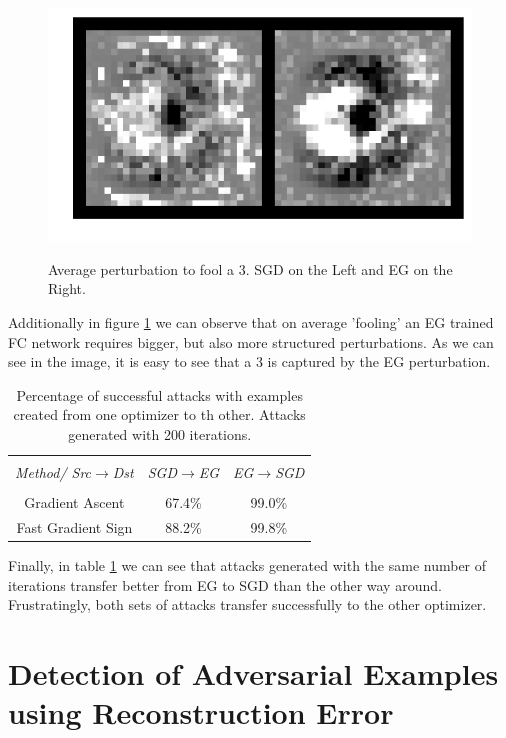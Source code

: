 \documentclass{asaproc}
\begin{document}
\begin{figure}
	\centering
	\caption{\enspace Average perturbation to fool a 3. SGD on the Left and EG on the Right.}
	\includegraphics[width=\linewidth]{avg_attack_3.png}
	\label{fig7}
\end{figure}

Additionally in figure \ref{fig7} we can observe that on average 'fooling' an EG trained FC network requires bigger, but also more structured perturbations. As we can see in the image, it is easy to see that a 3 is captured by the EG perturbation.

\begin{table}
	\caption{\enspace Percentage of successful attacks with examples created from one optimizer to th other. Attacks generated with 200 iterations.}
	\label{tab3}
	\begin{tabular*}{\hsize}{@{\extracolsep{\fill}}ccc}
		\hline
		\\[-7pt]
		\multicolumn{1}{c}{\it Method/ Src$\to$Dst} & 
		\multicolumn{1}{c}{\it SGD$\to$EG}          & 
		\multicolumn{1}{c}{\it EG$\to$SGD}          \\ 
		\hline
		\\[-5pt] 
		Gradient Ascent     & 67.4\% & 99.0\% \\
		Fast Gradient Sign  & 88.2\% & 99.8\%
	\end{tabular*}
\end{table}

Finally, in table \ref{tab3} we can see that attacks generated with the same number of iterations transfer better from EG to SGD than the other way around. Frustratingly, both sets of attacks transfer successfully to the other optimizer. 

\section*{Detection of Adversarial Examples using Reconstruction Error}
\end{document}
